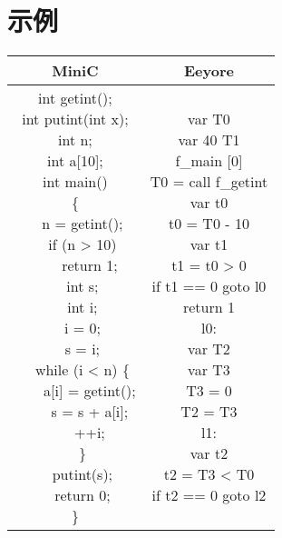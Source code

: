 \documentclass{ctexart}
\newenvironment{typewriterfont}{\ttfamily}{\par}
\begin{document}
\section{示例}
\begin{table}[H]
    \centering
    \begin{typewriterfont}
    \begin{tabular}{|c|c|}
        \hline
        MiniC & Eeyore \\
        \hline
        \makecell[l]{
int getint();\\
int putint(int x);\\
int n;\\
int a[10];\\
int main()\\
\{\\
\ \ n = getint();\\
\ \ if (n > 10)\\
\ \ \ \ return 1;\\
\ \ int s;\\
\ \ int i;\\
\ \ i = 0;\\
\ \ s = i;\\
\ \ while (i < n) \{\\
\ \ \ \ a[i] = getint();\\
\ \ \ \ s = s + a[i];\\
\ \ \ \ ++i;\\
\ \ \}\\
\ \ putint(s);\\
\ \ return 0;\\
\}
        } & \makecell[l]{
var T0\\
var 40 T1\\
f\_main [0]\\
T0 = call f\_getint\\
var t0\\
t0 = T0 - 10\\
var t1\\
t1 = t0 > 0\\
if t1 == 0 goto l0\\
return 1\\
l0:\\
var T2\\
var T3\\
T3 = 0\\
T2 = T3\\
l1:\\
var t2\\
t2 = T3 < T0\\
if t2 == 0 goto l2\\
}
\end{tabular}
\end{typewriterfont}
\end{table}
\end{document}
